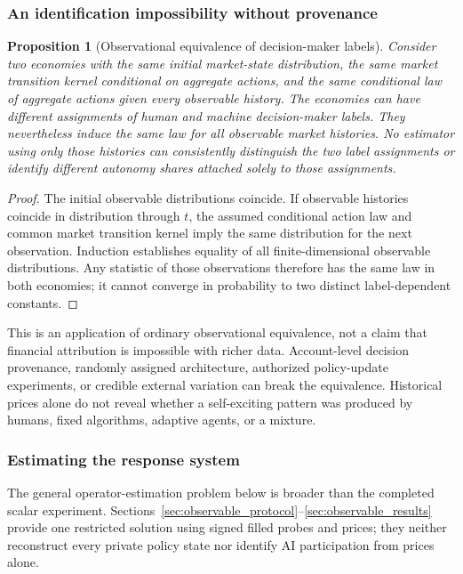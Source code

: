 \documentclass[10pt,twocolumn,letterpaper]{article}
\newtheorem{proposition}[theorem]{Proposition}
\theoremstyle{definition}
\theoremstyle{remark}
\begin{document}
\subsubsection{An identification impossibility without provenance}
\begin{proposition}[Observational equivalence of decision-maker labels]
\label{prop:identification}
Consider two economies with the same initial market-state distribution, the same market transition kernel conditional on aggregate actions, and the same conditional law of aggregate actions given every observable history. The economies can have different assignments of human and machine decision-maker labels. They nevertheless induce the same law for all observable market histories. No estimator using only those histories can consistently distinguish the two label assignments or identify different autonomy shares attached solely to those assignments.
\end{proposition}
\begin{proof}
The initial observable distributions coincide. If observable histories coincide in distribution through $t$, the assumed conditional action law and common market transition kernel imply the same distribution for the next observation. Induction establishes equality of all finite-dimensional observable distributions. Any statistic of those observations therefore has the same law in both economies; it cannot converge in probability to two distinct label-dependent constants.
\end{proof}
This is an application of ordinary observational equivalence, not a claim that financial attribution is impossible with richer data. Account-level decision provenance, randomly assigned architecture, authorized policy-update experiments, or credible external variation can break the equivalence. Historical prices alone do not reveal whether a self-exciting pattern was produced by humans, fixed algorithms, adaptive agents, or a mixture.

\subsubsection{Estimating the response system}
The general operator-estimation problem below is broader than the completed scalar experiment. Sections~\ref{sec:observable_protocol}--\ref{sec:observable_results} provide one restricted solution using signed filled probes and prices; they neither reconstruct every private policy state nor identify AI participation from prices alone.
\end{document}
